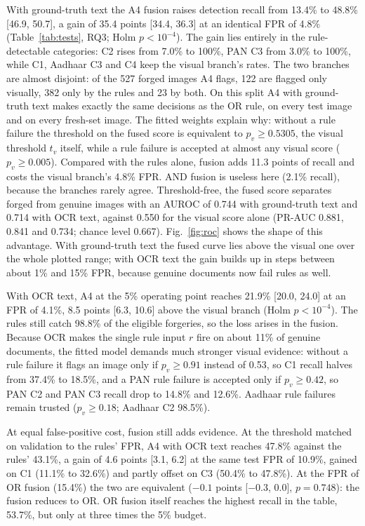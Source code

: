 \documentclass[12pt]{article}
\begin{document}
With ground-truth text the A4 fusion raises detection recall from
13.4\% to 48.8\% [46.9, 50.7], a gain of 35.4 points [34.4, 36.3] at an
identical FPR of 4.8\% (Table~\ref{tab:tests}, RQ3; Holm $p<10^{-4}$).
The gain lies entirely in the rule-detectable categories: C2 rises from
7.0\% to 100\%, PAN C3 from 3.0\% to 100\%, while C1, Aadhaar C3 and C4
keep the visual branch's rates. The two branches are almost disjoint:
of the 527 forged images A4 flags, 122 are flagged only visually, 382
only by the rules and 23 by both. On this split A4 with ground-truth
text makes exactly the same decisions as the OR rule, on every test
image and on every fresh-set image. The fitted weights explain why:
without a rule failure the threshold on the fused score is equivalent
to $p_v\ge0.5305$, the visual threshold $t_v$ itself, while a rule
failure is accepted at almost any visual score ($p_v\ge0.005$). Compared with the rules alone, fusion
adds 11.3 points of recall and costs the visual branch's 4.8\% FPR. AND
fusion is useless here (2.1\% recall), because the branches rarely
agree. Threshold-free, the fused score separates forged from genuine
images with an AUROC of 0.744 with ground-truth text and 0.714 with OCR
text, against 0.550 for the visual score alone (PR-AUC 0.881, 0.841 and
0.734; chance level 0.667). Fig.~\ref{fig:roc} shows the shape of
this advantage. With ground-truth text the fused curve lies above the
visual one over the whole plotted range; with OCR text the gain builds
up in steps between about 1\% and 15\% FPR, because genuine documents
now fail rules as well.


With OCR text, A4 at the 5\% operating point reaches 21.9\% [20.0, 24.0]
at an FPR of 4.1\%, 8.5 points [6.3, 10.6] above the visual branch
(Holm $p<10^{-4}$). The rules still catch 98.8\% of the eligible
forgeries, so the loss arises in the fusion. Because OCR makes the
single rule input $r$ fire on about 11\% of genuine documents, the fitted
model demands much stronger visual evidence: without a rule failure it
flags an image only if $p_v\ge0.91$ instead of 0.53, so C1 recall halves
from 37.4\% to 18.5\%, and a PAN rule failure is accepted only if
$p_v\ge0.42$, so PAN C2 and PAN C3 recall drop to 14.8\% and 12.6\%.
Aadhaar rule failures remain trusted ($p_v\ge0.18$; Aadhaar C2 98.5\%).

At equal false-positive cost, fusion still adds evidence. At the
threshold matched on validation to the rules' FPR, A4 with OCR text
reaches 47.8\% against the rules' 43.1\%, a gain of 4.6 points [3.1,
6.2] at the same test FPR of 10.9\%, gained on C1 (11.1\% to
32.6\%) and partly offset on C3 (50.4\% to 47.8\%). At the FPR of OR fusion (15.4\%) the two are equivalent
($-0.1$ points [$-0.3$, 0.0], $p=0.748$): the fusion reduces to OR. OR
fusion itself reaches the highest recall in the table, 53.7\%, but only
at three times the 5\% budget.
\end{document}
